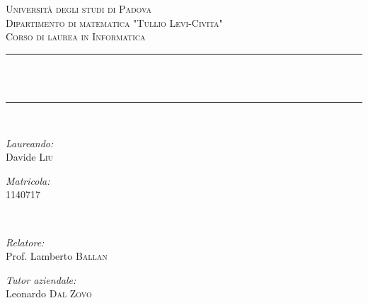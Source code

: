 \begin{titlepage}

\newcommand{\HRule}{\rule{\linewidth}{0.5mm}} %

\center %
 

\textsc{\LARGE Università degli studi di Padova}\\[0.5cm] %
\textsc{\Large Dipartimento di matematica "Tullio Levi-Civita"}\\[0.5cm] %
\textsc{\large Corso di laurea in Informatica}\\[0.5cm] %


\HRule \\[0.4cm]
{ \huge \bfseries \titolo}\\[0.4cm] %
\HRule \\[1.5cm]
 

\begin{minipage}{0.4\textwidth}
\begin{flushleft} \large
\emph{Laureando:}\\
Davide \textsc{Liu} %
\end{flushleft}
\begin{flushleft} \large
\emph{Matricola:}\\
1140717 %
\end{flushleft}
\end{minipage}
~
\begin{minipage}{0.4\textwidth}
\begin{flushright} \large
\emph{Relatore:} \\
Prof. Lamberto \textsc{Ballan} %
\end{flushright}
\begin{flushright} \large
\emph{Tutor aziendale:} \\
Leonardo \textsc{Dal Zovo} %
\end{flushright}
\end{minipage}\\[1cm]


\end{titlepage}
